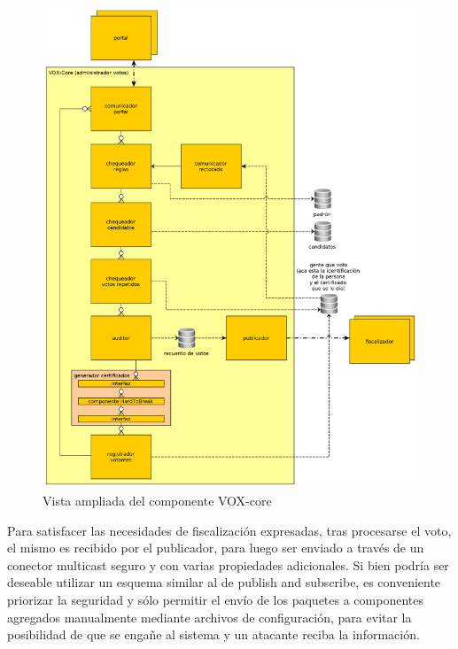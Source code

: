 \begin{figure}[H]
	\begin{center}
		\includegraphics[scale=0.26]{../diagramas/voxcore.png}
		\caption{Vista ampliada del componente VOX-core}
	\end{center} 
\end{figure} 
 
Para satisfacer las necesidades de fiscalización expresadas, tras procesarse el voto, el mismo es recibido por el publicador, 
para luego ser enviado a través de un conector multicast seguro y con varias propiedades adicionales. Si bien podría ser deseable utilizar un esquema similar al de publish and subscribe, es conveniente priorizar la seguridad y sólo permitir el envío de los paquetes a componentes agregados manualmente mediante archivos de configuración, para evitar la posibilidad de que se engañe al sistema y un atacante reciba la información.

